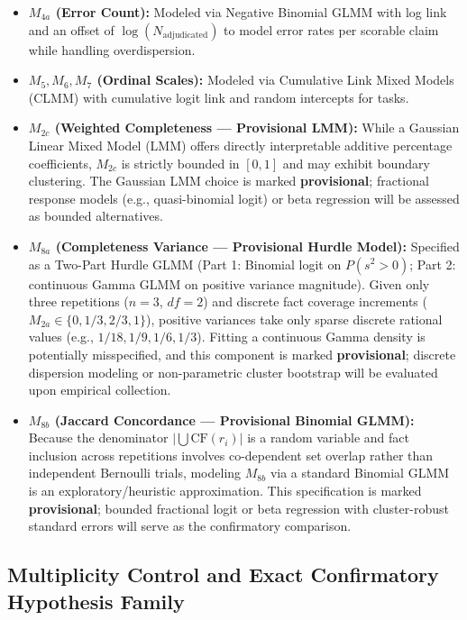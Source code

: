 \documentclass[11pt,a4paper]{article}
\begin{document}
\begin{itemize}
  \item \textbf{$M_{4a}$ (Error Count):} Modeled via Negative Binomial GLMM with log link and an offset of $\log(N_{\text{adjudicated}})$ to model error rates per scorable claim while handling overdispersion.
  \item \textbf{$M_5, M_6, M_7$ (Ordinal Scales):} Modeled via Cumulative Link Mixed Models (CLMM) with cumulative logit link and random intercepts for tasks.
  \item \textbf{$M_{2c}$ (Weighted Completeness --- Provisional LMM):} While a Gaussian Linear Mixed Model (LMM) offers directly interpretable additive percentage coefficients, $M_{2c}$ is strictly bounded in $[0, 1]$ and may exhibit boundary clustering. The Gaussian LMM choice is marked \textbf{provisional}; fractional response models (e.g., quasi-binomial logit) or beta regression will be assessed as bounded alternatives.
  \item \textbf{$M_{8a}$ (Completeness Variance --- Provisional Hurdle Model):} Specified as a Two-Part Hurdle GLMM (Part 1: Binomial logit on $P(s^2 > 0)$; Part 2: continuous Gamma GLMM on positive variance magnitude). Given only three repetitions ($n=3$, $df=2$) and discrete fact coverage increments ($M_{2a} \in \{0, 1/3, 2/3, 1\}$), positive variances take only sparse discrete rational values (e.g., $1/18, 1/9, 1/6, 1/3$). Fitting a continuous Gamma density is potentially misspecified, and this component is marked \textbf{provisional}; discrete dispersion modeling or non-parametric cluster bootstrap will be evaluated upon empirical collection.
  \item \textbf{$M_{8b}$ (Jaccard Concordance --- Provisional Binomial GLMM):} Because the denominator $|\bigcup \text{CF}(r_i)|$ is a random variable and fact inclusion across repetitions involves co-dependent set overlap rather than independent Bernoulli trials, modeling $M_{8b}$ via a standard Binomial GLMM is an exploratory/heuristic approximation. This specification is marked \textbf{provisional}; bounded fractional logit or beta regression with cluster-robust standard errors will serve as the confirmatory comparison.
\end{itemize}

\subsection{Multiplicity Control and Exact Confirmatory Hypothesis Family}
\label{sec:multiplicity}
\end{document}
